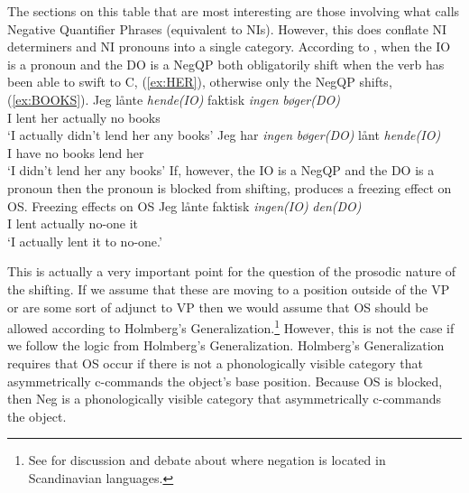 \documentclass[12pt, letterpaper]{article}
\begin{document}
The sections on this table that are most interesting are those involving what \citeauthor{christensenInterfacesNegationSyntax2005} calls Negative Quantifier Phrases (equivalent to NIs). However, this does conflate NI determiners and NI pronouns into a single category. According to \citeauthor{christensenInterfacesNegationSyntax2005}, when the IO is a pronoun and the DO is a NegQP both obligatorily shift when the verb has been able to swift to C, (\ref{ex:HER}), otherwise only the NegQP shifts, (\ref{ex:BOOKS}).
	\ea 
		\ea \label{ex:HER}
		\gll Jeg lånte \textit{hende(IO)} faktisk \textit{ingen} \textit{bøger(DO)}\\
		I lent her actually no books\\
		\glt `I actually didn't lend her any books'
		\ex \label{ex:BOOKS}
		\gll Jeg har \textit{ingen} \textit{bøger(DO)} lånt \textit{hende(IO)}\\
		I have no books lend her\\
		\glt `I didn't lend her any books'
		\z 
	\z 
If, however, the IO is a NegQP and the DO is a pronoun then the pronoun is blocked from shifting, produces a freezing effect on OS.
	\ea Freezing effects on OS
		\ea 
		\gll Jeg lånte faktisk \textit{ingen(IO)} \textit{den(DO)}\\
		I lent actually no-one it\\
		\glt `I actually lent it to no-one.'
		\z 
	\z

This is actually a very important point for the question of the prosodic nature of the shifting. If we assume that these are moving to a position outside of the VP or are some sort of adjunct to VP then we would assume that OS should be allowed according to Holmberg's Generalization.\footnote{See \citet{thrainssonSyntaxIcelandic2010} for discussion and debate about where negation is located in Scandinavian languages.} However, this is not the case if we follow the logic from Holmberg's Generalization. Holmberg's Generalization requires that OS occur if there is not a phonologically visible category that asymmetrically c-commands the object's base position. Because OS is blocked, then Neg is a phonologically visible category that asymmetrically c-commands the object. 
\end{document}
